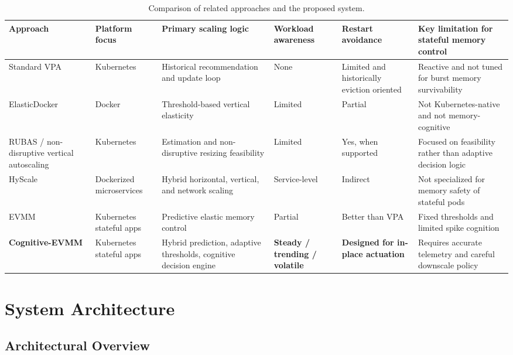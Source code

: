 \documentclass[12pt,a4paper]{article}
\begin{document}
\begin{table}[t]
\centering
\caption{Comparison of related approaches and the proposed system.}
\label{tab:related_comparison}
\begin{tabularx}{\textwidth}{L{2.8cm}L{1.8cm}L{2.4cm}L{2.2cm}L{2.2cm}Y}
\toprule
\textbf{Approach} & \textbf{Platform focus} & \textbf{Primary scaling logic} & \textbf{Workload awareness} & \textbf{Restart avoidance} & \textbf{Key limitation for stateful memory control} \\
\midrule
Standard VPA \cite{vpa-repo} & Kubernetes & Historical recommendation and update loop & None & Limited and historically eviction oriented & Reactive and not tuned for burst memory survivability \\
ElasticDocker \cite{elasticdocker} & Docker & Threshold-based vertical elasticity & Limited & Partial & Not Kubernetes-native and not memory-cognitive \\
RUBAS / non-disruptive vertical autoscaling \cite{rattihalli2019} & Kubernetes & Estimation and non-disruptive resizing feasibility & Limited & Yes, when supported & Focused on feasibility rather than adaptive decision logic \\
HyScale \cite{hyscale} & Dockerized microservices & Hybrid horizontal, vertical, and network scaling & Service-level & Indirect & Not specialized for memory safety of stateful pods \\
EVMM \cite{evmm2025} & Kubernetes stateful apps & Predictive elastic memory control & Partial & Better than VPA & Fixed thresholds and limited spike cognition \\
\textbf{Cognitive-EVMM} & Kubernetes stateful apps & Hybrid prediction, adaptive thresholds, cognitive decision engine & \textbf{Steady / trending / volatile} & \textbf{Designed for in-place actuation} & Requires accurate telemetry and careful downscale policy \\
\bottomrule
\end{tabularx}
\end{table}

\section{System Architecture}
\label{sec:architecture}

\subsection{Architectural Overview}
\end{document}
